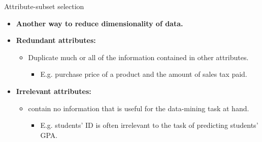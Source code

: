 \documentclass[aspectratio=169,t]{beamer}
\begin{document}
  { 
    \begin{frame}{Attribute-subset selection}
    \begin{itemize}
      \item \textbf{Another way to reduce dimensionality of data.}
      \item\textbf{\color{airforceblue}Redundant attributes:}
      \begin{itemize}
        \item Duplicate much or all of the information contained in other attributes.
        \begin{itemize}
          \item E.g. purchase price of a product and the amount of sales tax paid.
        \end{itemize}
      \end{itemize}
      \item \textbf{\color{airforceblue}Irrelevant attributes:}
      \begin{itemize}
        \item contain no information that is useful for the data-mining task at hand.
        \begin{itemize}
          \item E.g. students' ID is often irrelevant to the task of predicting students' GPA.
        \end{itemize}
      \end{itemize}
    \end{itemize}
    \end{frame}
  }
\end{document}
